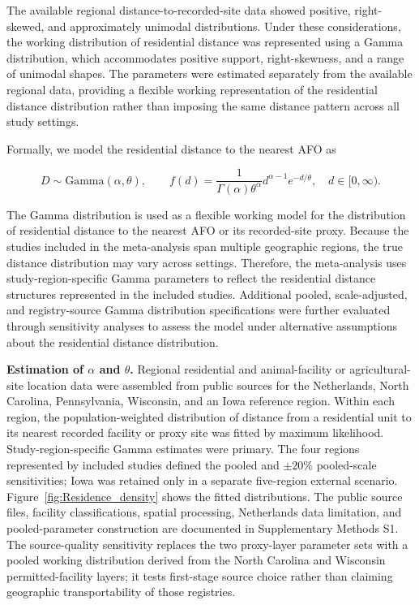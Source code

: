 \documentclass[journal=rsm]{CUP-JNL-DTM}%
\theoremstyle{definition}
\numberwithin{equation}{section}
\begin{document}
The available regional distance-to-recorded-site data showed positive, right-skewed, and
approximately unimodal distributions. Under these considerations, the
working distribution of residential distance was represented using a
Gamma distribution, which accommodates positive support, right-skewness, and
a range of unimodal shapes. The parameters were estimated separately from the
available regional data, providing a flexible working representation of the
residential distance distribution rather than imposing the same distance pattern
across all study settings.


Formally, we model the residential distance to the nearest AFO as

\begin{equation}
D \sim \mathrm{Gamma}(\alpha,\theta), 
\qquad
f(d)=\frac{1}{\Gamma(\alpha)\theta^\alpha}
d^{\alpha-1}e^{-d/\theta}, \quad d\in[0,\infty).
\label{eq:gamma_dist}
\end{equation}


The Gamma distribution is used as a flexible working model for the distribution of residential distance to the nearest AFO or its recorded-site proxy. Because the studies included in the meta-analysis span multiple geographic regions, the true distance distribution may vary across settings. Therefore, the meta-analysis uses study-region-specific Gamma parameters to reflect the residential distance structures represented in the included studies. Additional pooled, scale-adjusted, and registry-source Gamma distribution specifications were further evaluated through sensitivity analyses to assess the model under alternative assumptions about the residential distance distribution.


\noindent\textbf{Estimation of $\alpha$ and $\theta$.}
Regional residential and animal-facility or agricultural-site location data were assembled from public sources
for the Netherlands, North Carolina, Pennsylvania, Wisconsin, and an Iowa
reference region. Within each region, the population-weighted distribution of
distance from a residential unit to its nearest recorded facility or proxy site was fitted by
maximum likelihood. Study-region-specific Gamma estimates were primary. The
four regions represented by included studies defined the pooled and $\pm20\%$
pooled-scale sensitivities; Iowa was retained only in a separate five-region
external scenario. Figure~\ref{fig:Residence_density} shows
the fitted distributions. The public source files, facility classifications,
spatial processing, Netherlands data limitation, and pooled-parameter
construction are documented in Supplementary Methods S1. The source-quality
sensitivity replaces the two proxy-layer parameter sets with a pooled working
distribution derived from the North Carolina and Wisconsin permitted-facility
layers; it tests first-stage source choice rather than claiming geographic
transportability of those registries.
\end{document}

